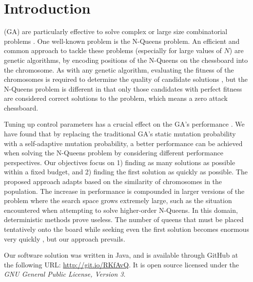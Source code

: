 \documentclass[conference]{IEEEtran}
\begin{document}

\section{Introduction}
 (GA) are particularly effective to solve complex or large size combinatorial problems \cite{cit:1,cit:2}. One well-known problem is the N-Queens problem. An efficient and common approach to tackle these problems (especially for large values of $N$) are genetic algorithms, by encoding positions of the N-Queens on the chessboard into the chromosome. As with any genetic algorithm, evaluating the fitness of the chromosomes is required to determine the quality of candidate solutions \cite{cit:8}, but the N-Queens problem is different in that only those candidates with perfect fitness are considered correct solutions to the problem, which means a zero attack chessboard. 

Tuning up control parameters has a crucial effect on the GA's performance \cite{cit:12,cit:13,cit:15,cit:7}. We have found that by replacing the traditional GA's static mutation probability with a self-adaptive mutation probability, a better performance can be achieved when solving the N-Queens problem by considering different performance perspectives. Our objectives focus on 1) finding as many solutions as possible within a fixed budget, and 2) finding the first solution as quickly as possible. The proposed approach adapts based on the similarity of chromosomes in the population. The increase in performance is compounded in larger versions of the problem where the search space grows extremely large, such as the situation encountered when attempting to solve higher-order N-Queens. In this domain, deterministic methods prove useless. The number of queens that must be placed tentatively onto the board while seeking even the first solution becomes enormous very quickly \cite{cit:21}, but our approach prevails.

Our software solution was written in Java, and is available through GitHub at the following URL: \url{http://git.io/RKfAvQ}. It is open source licensed under the \textit{GNU General Public License, Version 3}.
\end{document}
